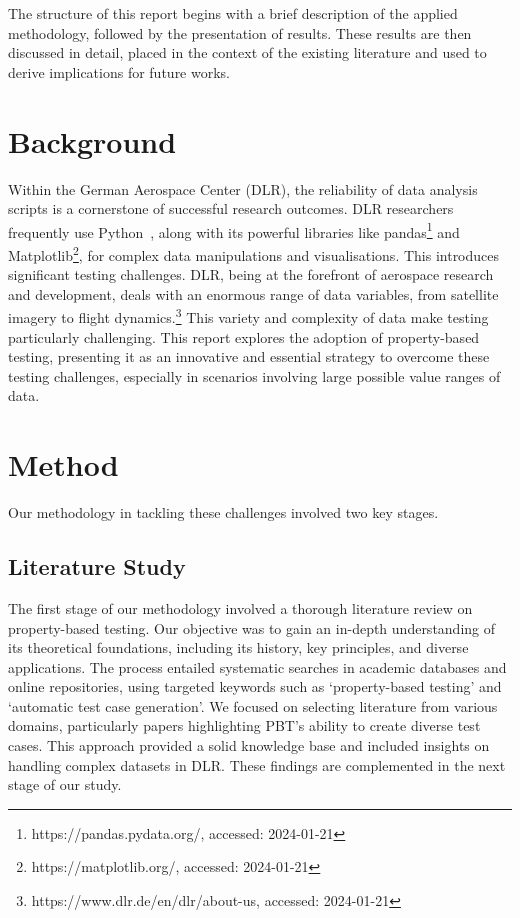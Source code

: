 \documentclass[runningheads]{llncs}
\begin{document}
The structure of this report begins with a brief description of the applied methodology, followed by the presentation of results. These results are then discussed in detail, placed in the context of the existing literature and used to derive implications for future works.

\section{Background}
Within the German Aerospace Center (DLR), the reliability of data analysis scripts is a cornerstone of successful research outcomes. DLR researchers frequently use Python~\cite{Kurnatowski2020}, along with its powerful libraries like pandas\footnote{https://pandas.pydata.org/, accessed: 2024-01-21} and Matplotlib\footnote{https://matplotlib.org/, accessed: 2024-01-21}, for complex data manipulations and visualisations. This introduces significant testing challenges. DLR, being at the forefront of aerospace research and development, deals with an enormous range of data variables, from satellite imagery to flight dynamics.\footnote{https://www.dlr.de/en/dlr/about-us, accessed: 2024-01-21} This variety and complexity of data make testing particularly challenging. This report explores the adoption of property-based testing, presenting it as an innovative and essential strategy to overcome these testing challenges, especially in scenarios involving large possible value ranges of data.

\section{Method}
Our methodology in tackling these challenges involved two key stages.

\subsection{Literature Study}
The first stage of our methodology involved a thorough literature review on property-based testing. Our objective was to gain an in-depth understanding of its theoretical foundations, including its history, key principles, and diverse applications. The process entailed systematic searches in academic databases and online repositories, using targeted keywords such as `property-based testing' and `automatic test case generation'. We focused on selecting literature from various domains, particularly papers highlighting PBT's ability to create diverse test cases. This approach provided a solid knowledge base and included insights on handling complex datasets in DLR. These findings are complemented in the next stage of our study.
\end{document}
